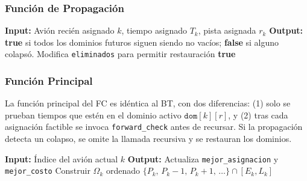 \documentclass[12pt]{article}
\begin{document}
\subsubsection{Función de Propagación}

\begin{algorithm}[H]
\vspace{2mm}
\textbf{Input:} Avión recién asignado $k$, tiempo asignado $T_k$, pista asignada $r_k$\;
\textbf{Output:} \textbf{true} si todos los dominios futuros siguen siendo no vacíos; \textbf{false} si alguno colapsó. Modifica \texttt{eliminados} para permitir restauración\;
\BlankLine
{}
\Return \textbf{true}\;
\vspace{2mm}
\caption{forward\_check}
\end{algorithm}

\subsubsection{Función Principal}

La función principal del FC es idéntica al BT, con dos diferencias: (1) solo se prueban tiempos que estén en el dominio activo $\texttt{dom}[k][r]$, y (2) tras cada asignación factible se invoca \texttt{forward\_check} antes de recursar. Si la propagación detecta un colapso, se omite la llamada recursiva y se restauran los dominios.

\begin{algorithm}[H]
\vspace{2mm}
\textbf{Input:} Índice del avión actual $k$\;
\textbf{Output:} Actualiza \texttt{mejor\_asignacion} y \texttt{mejor\_costo}\;
\BlankLine
{}
\BlankLine
Construir $\Omega_k$ ordenado $\{P_k,\, P_k{-}1,\, P_k{+}1,\, \dots\} \cap [E_k, L_k]$\;
\BlankLine
{}
\vspace{2mm}
\caption{fc}
\end{algorithm}
\end{document}
